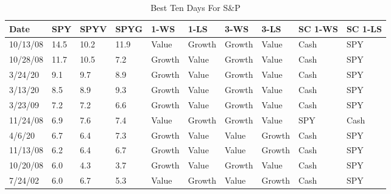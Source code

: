 \documentclass{article}
\begin{document}
\begin{table}[!ht]
    \centering
    \caption{Best Ten Days For S\&P}
    \begin{tabular}{|l|l|l|l|l|l|l|l|l|l|}
    \hline
        Date & SPY & SPYV & SPYG & 1-WS & 1-LS & 3-WS & 3-LS & SC 1-WS & SC 1-LS \\ \hline
        10/13/08 & 14.5 & 10.2 & 11.9 & Value & Growth & Growth & Value & Cash & SPY \\ \hline
        10/28/08 & 11.7 & 10.5 & 7.2 & Growth & Value & Growth & Value & Cash & SPY \\ \hline
        3/24/20 & 9.1 & 9.7 & 8.9 & Growth & Value & Growth & Value & Cash & SPY \\ \hline
        3/13/20 & 8.5 & 8.9 & 9.3 & Growth & Value & Growth & Value & Cash & SPY \\ \hline
        3/23/09 & 7.2 & 7.2 & 6.6 & Growth & Value & Growth & Value & Cash & SPY \\ \hline
        11/24/08 & 6.9 & 7.6 & 7.4 & Value & Growth & Growth & Value & SPY & Cash \\ \hline
        4/6/20 & 6.7 & 6.4 & 7.3 & Growth & Value & Value & Growth & Cash & SPY \\ \hline
        11/13/08 & 6.2 & 6.4 & 6.7 & Growth & Value & Value & Growth & Cash & SPY \\ \hline
        10/20/08 & 6.0 & 4.3 & 3.7 & Growth & Value & Growth & Value & Cash & SPY \\ \hline
        7/24/02 & 6.0 & 6.7 & 5.3 & Value & Growth & Value & Growth & Cash & SPY \\ \hline
    \end{tabular}
\end{table}
\end{document}
